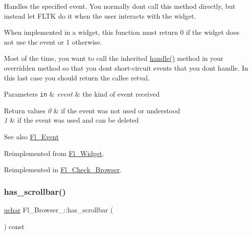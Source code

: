 Handles the specified event. You normally don\textquotesingle{}t call this method directly, but instead let F\+L\+TK do it when the user interacts with the widget.

When implemented in a widget, this function must return 0 if the widget does not use the event or 1 otherwise.

Most of the time, you want to call the inherited \hyperlink{class_fl___browser___a63015169440ce8d6c979abcc2a27d359}{handle()} method in your overridden method so that you don\textquotesingle{}t short-\/circuit events that you don\textquotesingle{}t handle. In this last case you should return the callee retval.


\begin{DoxyParams}[1]{Parameters}
\mbox{\tt in}  & {\em event} & the kind of event received \\
\hline
\end{DoxyParams}

\begin{DoxyRetVals}{Return values}
{\em 0} & if the event was not used or understood \\
\hline
{\em 1} & if the event was used and can be deleted \\
\hline
\end{DoxyRetVals}
\begin{DoxySeeAlso}{See also}
\hyperlink{_enumerations_8_h_ad16daf120d9a0501cccaee563af0b9a3}{Fl\+\_\+\+Event} 
\end{DoxySeeAlso}


Reimplemented from \hyperlink{class_fl___widget_a3521aba25eda761620953dd49d335ea7}{Fl\+\_\+\+Widget}.



Reimplemented in \hyperlink{class_fl___check___browser_acdc1442cb069cec53f6b6263201a4af6}{Fl\+\_\+\+Check\+\_\+\+Browser}.

\mbox{\label{class_fl___browser___a67d0ca392fbc14371277661a4ab75fc7}} 
\subsubsection{\texorpdfstring{has\+\_\+scrollbar()}{has\_scrollbar()}\hspace{0.1cm}{\footnotesize\ttfamily [1/2]}}
{\footnotesize\ttfamily \hyperlink{fl__types_8h_a65f85814a8290f9797005d3b28e7e5fc}{uchar} Fl\+\_\+\+Browser\+\_\+\+::has\+\_\+scrollbar (\begin{DoxyParamCaption}{ }\end{DoxyParamCaption}) const\hspace{0.3cm}{\ttfamily [inline]}}

